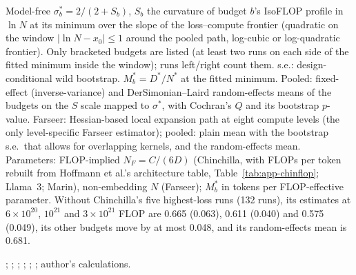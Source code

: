\begin{table}[tp]
\begin{tablenotes}
Model-free $\sigma^*_b=2/(2+S_b)$, $S_b$ the curvature of budget $b$'s IsoFLOP profile in $\ln N$ at its minimum over the slope of the loss--compute frontier (quadratic on the window $|\ln N-x_0|\le1$ around the pooled path, log-cubic or log-quadratic frontier). Only bracketed budgets are listed (at least two runs on each side of the fitted minimum inside the window); runs left/right count them. s.e.: design-conditional wild bootstrap. $M^*_b=D^*/N^*$ at the fitted minimum. Pooled: fixed-effect (inverse-variance) and DerSimonian--Laird random-effects means of the budgets on the $S$ scale mapped to $\sigma^*$, with Cochran's $Q$ and its bootstrap $p$-value. Farseer: Hessian-based local expansion path at eight compute levels (the only level-specific Farseer estimator); pooled: plain mean with the bootstrap s.e.\ that allows for overlapping kernels, and the random-effects mean. Parameters: FLOP-implied $N_F=C/(6D)$ (Chinchilla, with FLOPs per token rebuilt from Hoffmann et al.'s architecture table, Table~\ref{tab:app-chinflop}; Llama~3; Marin), non-embedding $N$ (Farseer); $M^*_b$ in tokens per FLOP-effective parameter. Without Chinchilla's five highest-loss runs (132 runs), its estimates at $6\times10^{20}$, $10^{21}$ and $3\times10^{21}$ FLOP are 0.665 (0.063), 0.611 (0.040) and 0.575 (0.049), its other budgets move by at most 0.048, and its random-effects mean is 0.681.
\end{tablenotes}

\begin{tablenotes}[Source]
\citet{hoffmann2022training}; \citet{besiroglu2024chinchilla}; \citet{grattafiori2024llama}; \citet{czech2026llama3isoflop}; \citet{marin2026ladders}; \citet{li2025predictableb}; author's calculations.
\end{tablenotes}
\end{table}

